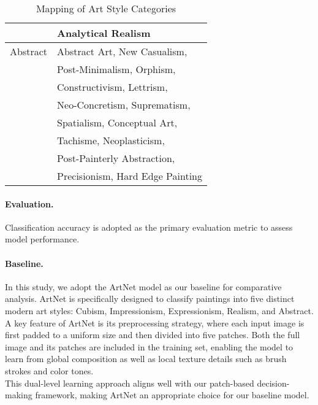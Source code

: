 \begin{table}[ht]
\begin{tabular}{@{}p{} p{}@{}}
                                & Analytical Realism               \\
        \midrule
        Abstract                & Abstract Art, New Casualism,     \\
                                & Post-Minimalism, Orphism,        \\
                                & Constructivism, Lettrism,        \\
                                & Neo-Concretism, Suprematism,     \\
                                & Spatialism, Conceptual Art,      \\
                                & Tachisme, Neoplasticism,         \\
                                & Post-Painterly Abstraction,      \\
                                & Precisionism, Hard Edge Painting \\
        \bottomrule
    \end{tabular}
    \caption{Mapping of Art Style Categories}
    \label{tab:style_mapping_halfwidth_80}
\end{table}

\paragraph{Evaluation.}
Classification accuracy is adopted as the primary evaluation metric to assess
model performance.
\paragraph{Baseline.}
In this study, we adopt the ArtNet model \cite{artnet} as our baseline for
comparative analysis. ArtNet is specifically designed to classify paintings
into five distinct modern art styles: Cubism, Impressionism, Expressionism,
Realism, and Abstract. A key feature of ArtNet is its preprocessing strategy,
where each input image is first padded to a uniform size and then divided into
five patches. Both the full image and its patches are included in the training
set, enabling the model to learn from global composition as well as local
texture details such as brush strokes and color tones. \\ This dual-level
learning approach aligns well with our patch-based decision-making framework,
making ArtNet an appropriate choice for our baseline model.

